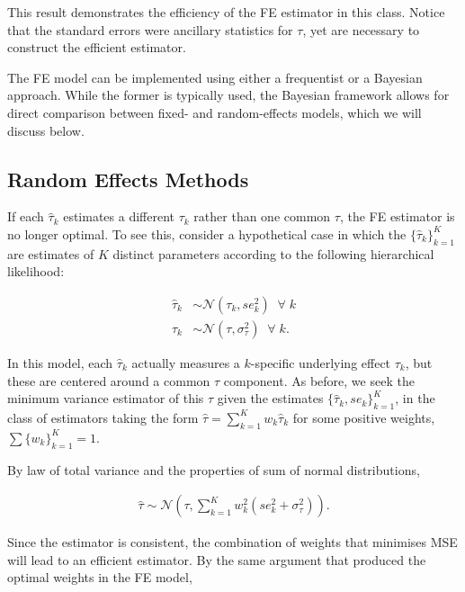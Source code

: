 \documentclass[12pt]{article}
\begin{document}
This result demonstrates the efficiency of the FE estimator in this class. Notice that the standard errors were ancillary statistics for $\tau$, yet are necessary to construct the efficient estimator. 

The FE model can be implemented using either a frequentist or a Bayesian approach. While the former is typically used, the Bayesian framework allows for direct comparison between fixed- and random-effects models, which we will discuss below. 



\subsection{Random Effects Methods}

If each $\hat{\tau}_k$ estimates a different $\tau_k$ rather than one common $\tau$, the FE estimator is no longer optimal. To see this, consider a hypothetical case in which the $\{\hat{\tau}_k\}_{k=1}^K$ are estimates of $K$ distinct parameters according to the following hierarchical likelihood:

\begin{equation}\label{rubin}
\begin{aligned}
\hat{\tau}_k &\sim \mathcal{N}(\tau_k, se^2_{k}) \; \; \forall \;k\\
\tau_k &\sim \mathcal{N}(\tau, \sigma^2_{\tau}) \; \; \forall\; k.
\end{aligned}
\end{equation}

In this model, each $\hat{\tau}_k$ actually measures a $k$-specific underlying effect $\tau_k$, but these are centered around a common $\tau$ component. As before, we seek the minimum variance estimator of this $\tau$ given the estimates $\{\hat{\tau}_k, se_k\}_{k=1}^K$, in the class of estimators taking the form  $\hat{\tau} = \sum_{k=1}^{K} w_k \hat{\tau}_k$ for some positive weights, $\sum \{w_k\}_{k=1}^K =1$. 

By law of total variance and the properties of sum of normal distributions,

\begin{equation}
\begin{aligned}
\hat{\tau} \sim \mathcal{N}(\tau, \sum_{k=1}^{K} w_k^2( se^2_{k} + \sigma^2_{\tau})).
\end{aligned}
\end{equation}


Since the estimator is consistent, the combination of weights that minimises MSE will lead to an efficient estimator. By the same argument that produced the optimal weights in the FE model, 
\end{document}
